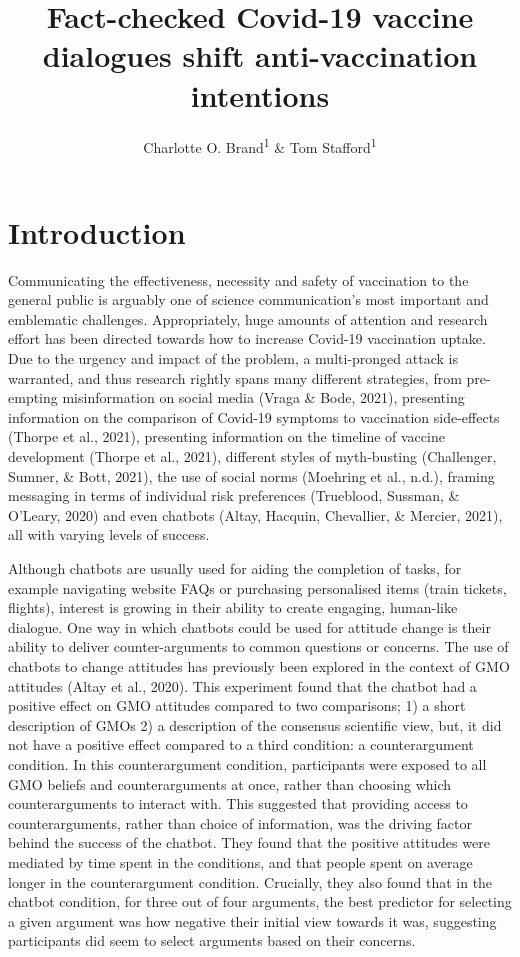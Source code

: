 \documentclass[english,,jou,floatsintext]{apa6}
\title{Fact-checked Covid-19 vaccine dialogues shift anti-vaccination intentions}
\author{Charlotte O. Brand\textsuperscript{1} \& Tom Stafford\textsuperscript{1}}
\date{}
\affiliation{\vspace{0.5cm}\textsuperscript{1} University of Sheffield, Department of Psychology}
\begin{document}
\maketitle

\hypertarget{introduction}{%
\section{Introduction}\label{introduction}}

Communicating the effectiveness, necessity and safety of vaccination to the general public is arguably one of science communication's most important and emblematic challenges. Appropriately, huge amounts of attention and research effort has been directed towards how to increase Covid-19 vaccination uptake. Due to the urgency and impact of the problem, a multi-pronged attack is warranted, and thus research rightly spans many different strategies, from pre-empting misinformation on social media (Vraga \& Bode, 2021), presenting information on the comparison of Covid-19 symptoms to vaccination side-effects (Thorpe et al., 2021), presenting information on the timeline of vaccine development (Thorpe et al., 2021), different styles of myth-busting (Challenger, Sumner, \& Bott, 2021), the use of social norms (Moehring et al., n.d.), framing messaging in terms of individual risk preferences (Trueblood, Sussman, \& O'Leary, 2020) and even chatbots (Altay, Hacquin, Chevallier, \& Mercier, 2021), all with varying levels of success.

Although chatbots are usually used for aiding the completion of tasks, for example navigating website FAQs or purchasing personalised items (train tickets, flights), interest is growing in their ability to create engaging, human-like dialogue. One way in which chatbots could be used for attitude change is their ability to deliver counter-arguments to common questions or concerns. The use of chatbots to change attitudes has previously been explored in the context of GMO attitudes (Altay et al., 2020). This experiment found that the chatbot had a positive effect on GMO attitudes compared to two comparisons; 1) a short description of GMOs 2) a description of the consensus scientific view, but, it did not have a positive effect compared to a third condition: a counterargument condition. In this counterargument condition, participants were exposed to all GMO beliefs and counterarguments at once, rather than choosing which counterarguments to interact with. This suggested that providing access to counterarguments, rather than choice of information, was the driving factor behind the success of the chatbot. They found that the positive attitudes were mediated by time spent in the conditions, and that people spent on average longer in the counterargument condition. Crucially, they also found that in the chatbot condition, for three out of four arguments, the best predictor for selecting a given argument was how negative their initial view towards it was, suggesting participants did seem to select arguments based on their concerns.
\end{document}
